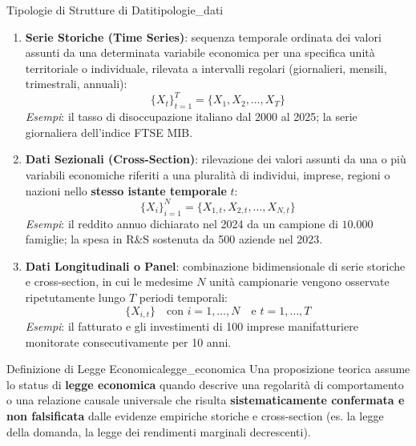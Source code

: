 \begin{definizione}{Tipologie di Strutture di Dati}{tipologie_dati}
\begin{enumerate}
    \item \textbf{Serie Storiche (Time Series)}: sequenza temporale ordinata dei valori assunti da una determinata variabile economica per una specifica unità territoriale o individuale, rilevata a intervalli regolari (giornalieri, mensili, trimestrali, annuali):
    \begin{equation}
        \{ X_t \}_{t=1}^T = \{ X_1, X_2, \dots, X_T \}
    \end{equation}
    \textit{Esempi}: il tasso di disoccupazione italiano dal 2000 al 2025; la serie giornaliera dell'indice FTSE MIB.
    
    \item \textbf{Dati Sezionali (Cross-Section)}: rilevazione dei valori assunti da una o più variabili economiche riferiti a una pluralità di individui, imprese, regioni o nazioni nello \textbf{stesso istante temporale} $t$:
    \begin{equation}
        \{ X_{i} \}_{i=1}^N = \{ X_{1, t}, X_{2, t}, \dots, X_{N, t} \}
    \end{equation}
    \textit{Esempi}: il reddito annuo dichiarato nel 2024 da un campione di $10.000$ famiglie; la spesa in R\&S sostenuta da 500 aziende nel 2023.
    
    \item \textbf{Dati Longitudinali o Panel}: combinazione bidimensionale di serie storiche e cross-section, in cui le medesime $N$ unità campionarie vengono osservate ripetutamente lungo $T$ periodi temporali:
    \begin{equation}
        \{ X_{i,t} \} \quad \text{con } i = 1, \dots, N \quad \text{e } t = 1, \dots, T
    \end{equation}
    \textit{Esempi}: il fatturato e gli investimenti di 100 imprese manifatturiere monitorate consecutivamente per 10 anni.
\end{enumerate}
\end{definizione}

\begin{legge}{Definizione di Legge Economica}{legge_economica}
Una proposizione teorica assume lo status di \textbf{legge economica} quando descrive una regolarità di comportamento o una relazione causale universale che risulta \textbf{sistematicamente confermata e non falsificata} dalle evidenze empiriche storiche e cross-section (es. la legge della domanda, la legge dei rendimenti marginali decrescenti).
\end{legge}

